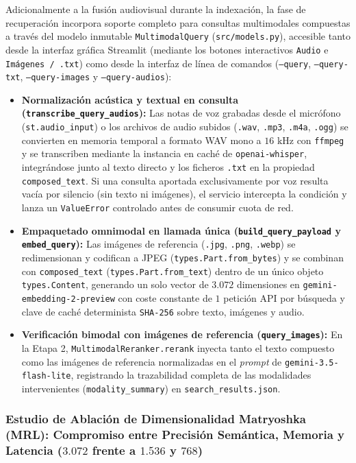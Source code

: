 Adicionalmente a la fusión audiovisual durante la indexación, la fase de recuperación incorpora soporte completo para consultas multimodales compuestas a través del modelo inmutable \texttt{MultimodalQuery} (\texttt{src/models.py}), accesible tanto desde la interfaz gráfica Streamlit (mediante los botones interactivos \texttt{Audio} e \texttt{Imágenes / .txt}) como desde la interfaz de línea de comandos (\texttt{--query}, \texttt{--query-txt}, \texttt{--query-images} y \texttt{--query-audios}):
\begin{itemize}
    \item \textbf{Normalización acústica y textual en consulta (\texttt{transcribe\_query\_audios}):} Las notas de voz grabadas desde el micrófono (\texttt{st.audio\_input}) o los archivos de audio subidos (\texttt{.wav}, \texttt{.mp3}, \texttt{.m4a}, \texttt{.ogg}) se convierten en memoria temporal a formato WAV mono a $16\text{ kHz}$ con \texttt{ffmpeg} y se transcriben mediante la instancia en caché de \texttt{openai-whisper}, integrándose junto al texto directo y los ficheros \texttt{.txt} en la propiedad \texttt{composed\_text}. Si una consulta aportada exclusivamente por voz resulta vacía por silencio (sin texto ni imágenes), el servicio intercepta la condición y lanza un \texttt{ValueError} controlado antes de consumir cuota de red.
    \item \textbf{Empaquetado omnimodal en llamada única (\texttt{build\_query\_payload} y \texttt{embed\_query}):} Las imágenes de referencia (\texttt{.jpg}, \texttt{.png}, \texttt{.webp}) se redimensionan y codifican a JPEG (\texttt{types.Part.from\_bytes}) y se combinan con \texttt{composed\_text} (\texttt{types.Part.from\_text}) dentro de un único objeto \texttt{types.Content}, generando un solo vector de $3.072$ dimensiones en \texttt{gemini-embedding-2-preview} con coste constante de $1$ petición API por búsqueda y clave de caché determinista \texttt{SHA-256} sobre texto, imágenes y audio.
    \item \textbf{Verificación bimodal con imágenes de referencia (\texttt{query\_images}):} En la Etapa 2, \texttt{MultimodalReranker.rerank} inyecta tanto el texto compuesto como las imágenes de referencia normalizadas en el \textit{prompt} de \texttt{gemini-3.5-flash-lite}, registrando la trazabilidad completa de las modalidades intervenientes (\texttt{modality\_summary}) en \texttt{search\_results.json}.
\end{itemize}

\subsubsection{Estudio de Ablación de Dimensionalidad Matryoshka (MRL): Compromiso entre Precisión Semántica, Memoria y Latencia ($3.072$ frente a $1.536$ y $768$)}
\label{subsubsec:ablacion_dimensionalidad_matryoshka}

